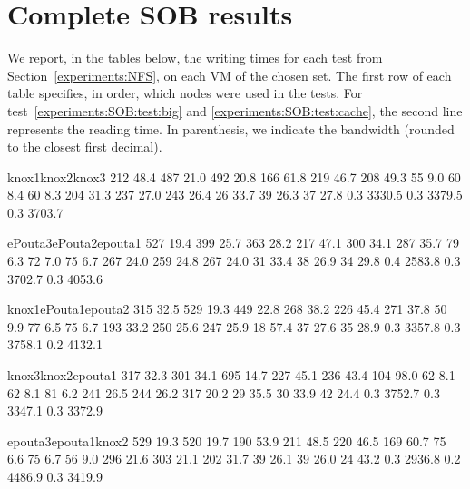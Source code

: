 \section{Complete SOB results}
\label{appendix:SOB}

We report, in the tables below, the writing times for each test from
Section~\ref{experiments:NFS}, on each VM of the chosen set.
%
The first row of each table specifies, in order, which nodes were used
in the tests.
%
For test~\ref{experiments:SOB:test:big} and
\ref{experiments:SOB:test:cache}, the second line represents the
reading time. In parenthesis, we indicate the bandwidth (rounded to
the closest first decimal).%

\noindent%
\resultpartition%
{{knox1}{knox2}{knox3}}%
{{ 212 }{ 48.4   }{ 487 }{ 21.0   }{ 492 }{ 20.8   }}%
{{ 166 }{ 61.8   }{ 219 }{ 46.7   }{ 208 }{ 49.3   }}%
{{  55 }{ 9.0    }{  60 }{ 8.4    }{  60 }{ 8.3    }}%
{{ 204 }{ 31.3   }{ 237 }{ 27.0   }{ 243 }{ 26.4   }}%
{{  26 }{ 33.7   }{  39 }{ 26.3   }{  37 }{ 27.8   }}%
{{ 0.3 }{ 3330.5 }{ 0.3 }{ 3379.5 }{ 0.3 }{ 3703.7 }}

\noindent%
\resultpartition%
{{ePouta3}{ePouta2}{epouta1}}%
{{ 527 }{ 19.4   }{ 399 }{ 25.7   }{ 363 }{ 28.2   }}%
{{ 217 }{ 47.1   }{ 300 }{ 34.1   }{ 287 }{ 35.7   }}%
{{  79 }{ 6.3    }{  72 }{ 7.0    }{  75 }{ 6.7    }}%
{{ 267 }{ 24.0   }{ 259 }{ 24.8   }{ 267 }{ 24.0   }}%
{{  31 }{ 33.4   }{  38 }{ 26.9   }{  34 }{ 29.8   }}%
{{ 0.4 }{ 2583.8 }{ 0.3 }{ 3702.7 }{ 0.3 }{ 4053.6 }}

\noindent%
\resultpartition%
{{knox1}{ePouta1}{epouta2}}%
{{ 315 }{ 32.5   }{ 529 }{ 19.3   }{ 449 }{ 22.8   }}%
{{ 268 }{ 38.2   }{ 226 }{ 45.4   }{ 271 }{ 37.8   }}%
{{  50 }{ 9.9    }{  77 }{ 6.5    }{  75 }{ 6.7    }}%
{{ 193 }{ 33.2   }{ 250 }{ 25.6   }{ 247 }{ 25.9   }}%
{{  18 }{ 57.4   }{  37 }{ 27.6   }{  35 }{ 28.9   }}%
{{ 0.3 }{ 3357.8 }{ 0.3 }{ 3758.1 }{ 0.2 }{ 4132.1 }}

\noindent%
\resultpartition%
{{knox3}{knox2}{epouta1}}%
{{ 317 }{ 32.3   }{ 301 }{ 34.1   }{ 695 }{ 14.7   }}%
{{ 227 }{ 45.1   }{ 236 }{ 43.4   }{ 104 }{ 98.0   }}%
{{  62 }{  8.1   }{  62 }{  8.1   }{  81 }{  6.2   }}%
{{ 241 }{ 26.5   }{ 244 }{ 26.2   }{ 317 }{ 20.2   }}%
{{  29 }{ 35.5   }{  30 }{ 33.9   }{  42 }{ 24.4   }}%
{{ 0.3 }{ 3752.7 }{ 0.3 }{ 3347.1 }{ 0.3 }{ 3372.9 }}

\noindent%
\resultpartition%
{{epouta3}{epouta1}{knox2}}%
{{ 529 }{ 19.3   }{ 520 }{ 19.7   }{ 190 }{ 53.9   }}%
{{ 211 }{ 48.5   }{ 220 }{ 46.5   }{ 169 }{ 60.7   }}%
{{  75 }{  6.6   }{  75 }{  6.7   }{  56 }{  9.0   }}%
{{ 296 }{ 21.6   }{ 303 }{ 21.1   }{ 202 }{ 31.7   }}%
{{  39 }{ 26.1   }{  39 }{ 26.0   }{  24 }{ 43.2   }}%
{{ 0.3 }{ 2936.8 }{ 0.2 }{ 4486.9 }{ 0.3 }{ 3419.9 }}

